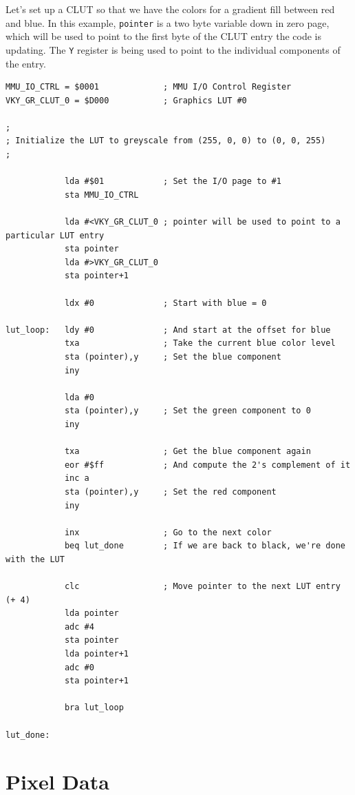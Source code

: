 
Let's set up a CLUT so that we have the colors for a gradient fill between red and blue. In this example, \verb+pointer+ is a two byte variable down in zero page, which will be used to point to the first byte of the CLUT entry the code is updating. The \verb+Y+ register is being used to point to the individual components of the entry.

\begin{verbatim}
MMU_IO_CTRL = $0001             ; MMU I/O Control Register
VKY_GR_CLUT_0 = $D000           ; Graphics LUT #0

;
; Initialize the LUT to greyscale from (255, 0, 0) to (0, 0, 255)
;

            lda #$01            ; Set the I/O page to #1
            sta MMU_IO_CTRL

            lda #<VKY_GR_CLUT_0 ; pointer will be used to point to a particular LUT entry
            sta pointer
            lda #>VKY_GR_CLUT_0
            sta pointer+1

            ldx #0              ; Start with blue = 0

lut_loop:   ldy #0              ; And start at the offset for blue
            txa                 ; Take the current blue color level
            sta (pointer),y     ; Set the blue component
            iny

            lda #0
            sta (pointer),y     ; Set the green component to 0
            iny

            txa                 ; Get the blue component again
            eor #$ff            ; And compute the 2's complement of it
            inc a
            sta (pointer),y     ; Set the red component
            iny

            inx                 ; Go to the next color
            beq lut_done        ; If we are back to black, we're done with the LUT

            clc                 ; Move pointer to the next LUT entry (+ 4)
            lda pointer
            adc #4
            sta pointer
            lda pointer+1
            adc #0
            sta pointer+1

            bra lut_loop

lut_done:
\end{verbatim}

\section{Pixel Data}

